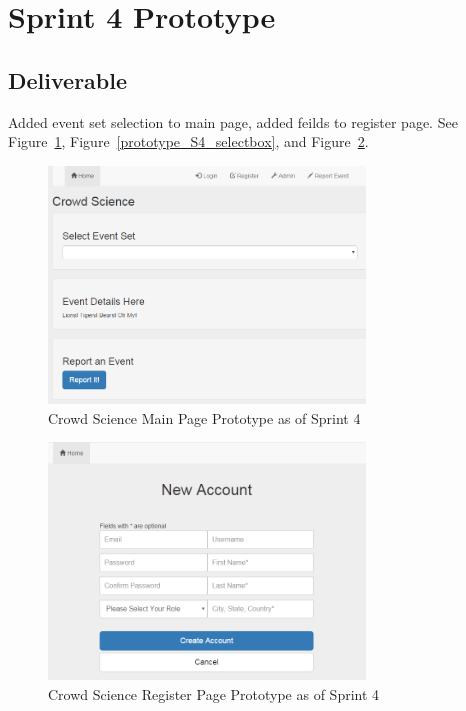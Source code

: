\section{Sprint 4 Prototype}
\subsection{Deliverable}
Added event set selection to main page, added feilds to register page. See Figure~\ref{prototype_S4_main}, Figure~\ref{prototype_S4_selectbox}, and Figure~\ref{prototype_S4_register}.

\begin{figure}[tbh]
\begin{center}
\includegraphics[width=0.75\textwidth]{./figures/prototype_S4_main.png}
\end{center}
\caption{Crowd Science Main Page Prototype as of Sprint 4\label{prototype_S4_main}}
\end{figure}

\begin{figure}[tbh]
\begin{center}
\includegraphics[width=0.75\textwidth]{./figures/prototype_S4_register.png}
\end{center}
\caption{Crowd Science Register Page Prototype as of Sprint 4\label{prototype_S4_register}}
\end{figure}

